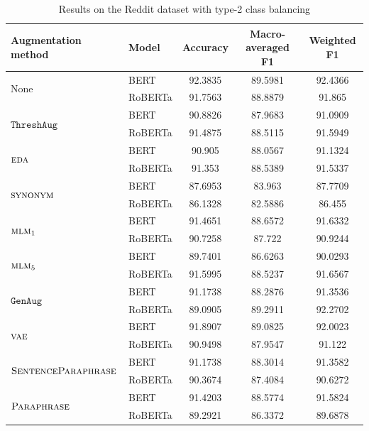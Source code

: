 \documentclass[11pt,a4paper]{article}
\newcommand{\noaug}{$\textrm{None}$}
\newcommand{\senttfpara}{$\textsc{SentenceParaphrase}$}
\newcommand{\tfpara}{$\textsc{Paraphrase}$}
\newcommand{\eda}{$\textsc{eda}$}
\newcommand{\synonym}{$\textsc{synonym}$}
\newcommand{\mlmone}{$\textsc{mlm}_1$}
\newcommand{\mlmfive}{$\textsc{mlm}_5$}
\newcommand{\genaug}{$\texttt{GenAug}$}
\newcommand{\threshaug}{$\texttt{ThreshAug}$}
\newcommand{\vae}{$\textsc{vae}$}
\begin{document}
\begin{table}[]
    \small
    \centering
    \begin{tabular}{llccc}
        \toprule
        \textbf{Augmentation method} & \textbf{Model} & \textbf{Accuracy} & \textbf{Macro-averaged F1} & \textbf{Weighted F1} \\
        \midrule
        \multirow{2}{*}{\noaug} & BERT & 92.3835 & 89.5981 & 92.4366 \\
         & RoBERTa & 91.7563 & 88.8879 & 91.865 \\\midrule
        
        \multirow{2}{*}{\threshaug} & BERT & 90.8826 & 87.9683 & 91.0909 \\
         & RoBERTa & 91.4875 & 88.5115 & 91.5949 \\\cmidrule{2-5}
        \multirow{2}{*}{\eda} & BERT & 90.905 & 88.0567 & 91.1324 \\
         & RoBERTa & 91.353 & 88.5389 & 91.5337 \\\midrule
         
        \multirow{2}{*}{\synonym} & BERT & 87.6953 & 83.963 & 87.7709 \\
         & RoBERTa & 86.1328 & 82.5886 & 86.455 \\\cmidrule{2-5}
        \multirow{2}{*}{\mlmone} & BERT & 91.4651 & 88.6572 & 91.6332 \\
         & RoBERTa & 90.7258 & 87.722 & 90.9244 \\\cmidrule{2-5}
        \multirow{2}{*}{\mlmfive} & BERT & 89.7401 & 86.6263 & 90.0293 \\
         & RoBERTa & 91.5995 & 88.5237 & 91.6567 \\\midrule
         
        \multirow{2}{*}{\genaug} & BERT & 91.1738 & 88.2876 & 91.3536 \\
         & RoBERTa & 89.0905 & 89.2911 & 92.2702 \\\cmidrule{2-5}
        \multirow{2}{*}{\vae} & BERT & 91.8907 & 89.0825 & 92.0023 \\
        & RoBERTa & 90.9498 & 87.9547 & 91.122 \\\midrule
        
        \multirow{2}{*}{\senttfpara} & BERT & 91.1738 & 88.3014 & 91.3582 \\
         & RoBERTa & 90.3674 & 87.4084 & 90.6272 \\\cmidrule{2-5}
        \multirow{2}{*}{\tfpara} & BERT & 91.4203 & 88.5774 & 91.5824 \\
         & RoBERTa & 89.2921 & 86.3372 & 89.6878 \\
        \bottomrule
    \end{tabular}
    \caption{Results on the Reddit dataset with type-2 class balancing}
    \label{tab:reddit2}
\end{table}
\end{document}
